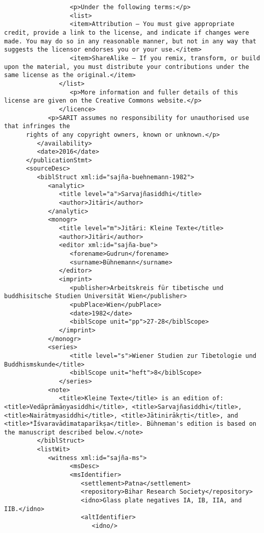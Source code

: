 \documentclass[article,12pt,a4paper]{memoir}%
\begin{document}
\begin{verbatim}
	              <p>Under the following terms:</p>
	              <list>
                  <item>Attribution — You must give appropriate credit, provide a link to the license, and indicate if changes were made. You may do so in any reasonable manner, but not in any way that suggests the licensor endorses you or your use.</item>
                  <item>ShareAlike — If you remix, transform, or build upon the material, you must distribute your contributions under the same license as the original.</item>
               </list>
	              <p>More information and fuller details of this license are given on the Creative Commons website.</p>
	           </licence>
            <p>SARIT assumes no responsibility for unauthorised use that infringes the
	  rights of any copyright owners, known or unknown.</p>
         </availability>
         <date>2016</date>
      </publicationStmt>
      <sourceDesc>
         <biblStruct xml:id="sajña-buehnemann-1982">
            <analytic>
               <title level="a">Sarvajñasiddhi</title>
               <author>Jitāri</author>
            </analytic>
            <monogr>
               <title level="m">Jitāri: Kleine Texte</title>
               <author>Jitāri</author>
               <editor xml:id="sajña-bue">
                  <forename>Gudrun</forename> 
                  <surname>Bühnemann</surname>
               </editor>
               <imprint>
                  <publisher>Arbeitskreis für tibetische und buddhisitsche Studien Universität Wien</publisher>
                  <pubPlace>Wien</pubPlace>
                  <date>1982</date>
                  <biblScope unit="pp">27-28</biblScope>
               </imprint>
            </monogr>
            <series>
	              <title level="s">Wiener Studien zur Tibetologie und Buddhismskunde</title>
	              <biblScope unit="heft">8</biblScope>
	           </series>
            <note>
               <title>Kleine Texte</title> is an edition of: <title>Vedāprāmāṇyasiddhi</title>, <title>Sarvajñasiddhi</title>, <title>Nairātmyasiddhi</title>, <title>Jātinirākṛti</title>, and <title>*Īśvaravādimataparīkṣa</title>. Bühneman's edition is based on the manuscript described below.</note>
         </biblStruct>
         <listWit>
            <witness xml:id="sajña-ms">
	              <msDesc>
                  <msIdentifier>
                     <settlement>Patna</settlement>
                     <repository>Bihar Research Society</repository>
                     <idno>Glass plate negatives IA, IB, IIA, and  IIB.</idno>
                     <altIdentifier>
                        <idno/>

\end{verbatim}
\end{document}
